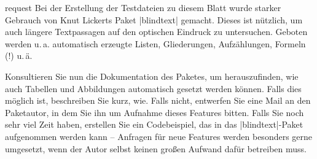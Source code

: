 \documentclass[
	blatt=9,
	ausgabe=12.\,06.\,2010,
	rückgabe=18.\,06.\,2010
]{lcourse-hd}
\begin{document}
\begin{expertexercise}[
  name={Feature Request},
  abgabe = Handschriftliche Erklärung der Funktionsweise bzw. fiktive Mail ausgedruckt.
]{request}
Bei der Erstellung der Testdateien zu diesem Blatt wurde starker Gebrauch von Knut Lickerts Paket |blindtext| gemacht. Dieses ist nützlich, um auch längere Textpassagen auf den optischen Eindruck zu untersuchen. Geboten werden u.\,a. automatisch erzeugte Listen, Gliederungen, Aufzählungen, Formeln (!) u.\,ä.

Konsultieren Sie nun die Dokumentation des Paketes, um herauszufinden, wie auch Tabellen und Abbildungen automatisch gesetzt werden können. Falls dies möglich ist, beschreiben Sie kurz, wie. Falls nicht, entwerfen Sie eine Mail an den Paketautor, in dem Sie ihn um Aufnahme dieses Features bitten. Falls Sie noch sehr viel Zeit haben, erstellen Sie ein Codebeispiel, das in das |blindtext|-Paket aufgenommen werden kann – Anfragen für neue Features werden besonders gerne umgesetzt, wenn der Autor selbst keinen großen Aufwand dafür betreiben muss.
\end{expertexercise}
\end{document}
